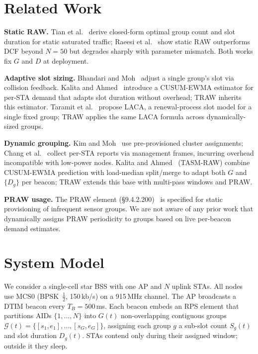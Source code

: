 \documentclass[conference]{IEEEtran}
\begin{document}
\section{Related Work}
\label{sec:related}

\textbf{Static RAW.}
Tian et al.~\cite{tian2016} derive closed-form optimal group count and
slot duration for static saturated traffic; Raeesi et al.~\cite{raeesi2014}
show static RAW outperforms DCF beyond $N\!=\!50$ but degrades sharply
with parameter mismatch.
Both works fix $G$ and $D$ at deployment.

\textbf{Adaptive slot sizing.}
Bhandari and Moh~\cite{bhandari2018} adjust a single group's slot via
collision feedback.
Kalita and Ahmed~\cite{kalita2025} introduce a CUSUM-EWMA estimator for
per-STA demand that adapts slot duration without overhead; TRAW inherits
this estimator.
Taramit et al.~\cite{taramit2023} propose LACA, a renewal-process slot
model for a single fixed group; TRAW applies the same LACA formula
across dynamically-sized groups.

\textbf{Dynamic grouping.}
Kim and Moh~\cite{kim2017} use pre-provisioned cluster assignments;
Chang et al.~\cite{chang2019} collect per-STA reports via management
frames, incurring overhead incompatible with low-power nodes.
Kalita and Ahmed~\cite{kalita2025b} (TASM-RAW) combine CUSUM-EWMA
prediction with load-median split/merge to adapt both $G$ and $\{D_g\}$
per beacon; TRAW extends this base with multi-pass windows and PRAW.

\textbf{PRAW usage.}
The PRAW element (\S9.4.2.200)~\cite{std80211ah} is specified for
static provisioning of infrequent sensor groups.
We are not aware of any prior work that dynamically assigns PRAW
periodicity to groups based on live per-beacon demand estimates.

\section{System Model}
\label{sec:model}

We consider a single-cell star BSS with one AP and $N$ uplink STAs.
All nodes use MCS0 (BPSK~$\frac{1}{2}$, 150\,kb/s) on a 915\,MHz
channel.
The AP broadcasts a DTIM beacon every $T_B\!=\!500$\,ms.
Each beacon embeds an RPS element that partitions AIDs
$\{1,\ldots,N\}$ into $G(t)$ non-overlapping contiguous groups
$\mathcal{G}(t)=\{[s_1,e_1],\ldots,[s_G,e_G]\}$, assigning each
group $g$ a sub-slot count $S_g(t)$ and slot duration $D_g(t)$.
STAs contend only during their assigned window; outside it they sleep.
\end{document}
